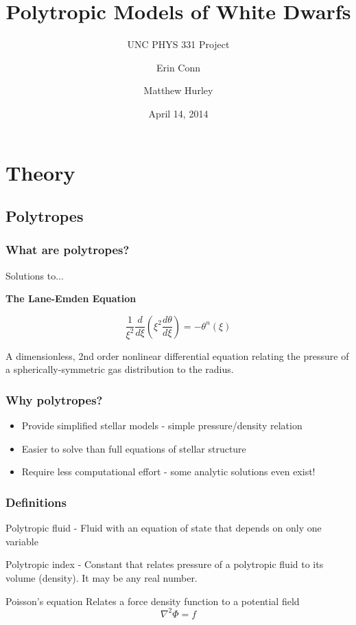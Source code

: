 \documentclass[handout]{beamer}
\title[Polytropes] %
{Polytropic Models of White Dwarfs}
\subtitle{UNC PHYS 331 Project}
\author[Conn, Hurley] %
{Erin Conn \and Matthew Hurley}
\date{April 14, 2014}
\begin{document}
    \frame{\titlepage}

    \section{Theory}

        \subsection{Polytropes}

        \begin{frame}
            \frametitle{What are polytropes?}
            
            \pause
            Solutions to...

            \textbf{The Lane-Emden Equation}

            \[
                \frac{1}{\xi^2}\frac{d}{d\xi}\left(\xi^2\frac{d\theta}{d\xi}\right)=-\theta^n(\xi)
            \]

            A dimensionless, 2nd order nonlinear differential equation relating the
            pressure of a spherically-symmetric gas distribution to the radius.

        \end{frame}

        \begin{frame}
            \frametitle{Why polytropes?}

            \begin{itemize}
                \item Provide simplified stellar models - simple pressure/density relation
                    \pause
                \item Easier to solve than full equations of stellar structure
                    \pause
                \item Require less computational effort - some analytic solutions even exist!
            \end{itemize}

        \end{frame}

        \begin{frame}
            \frametitle{Definitions}

            \begin{definition}
                \alert{Polytropic fluid} - Fluid with an equation of state that depends on only one variable
                
            \end{definition} 
                    \pause
            \begin{definition}
                \alert{Polytropic index} - Constant that relates pressure of a polytropic fluid to its volume (density). It may be any real number.
            \end{definition}
            \pause
            \begin{definition}
                \alert{Poisson's equation} Relates a force density function to a potential field
                    \[\nabla^2\Phi=f\]
            \end{definition}

        \end{frame}
\end{document}
